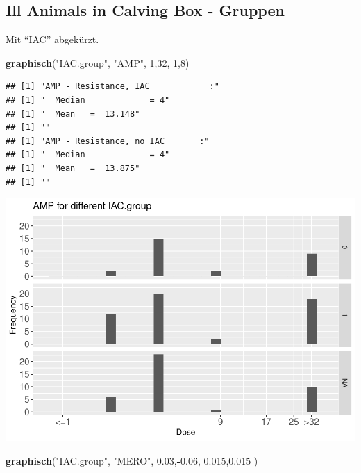 \documentclass[
]{article}
\newenvironment{Shaded}{\begin{snugshade}}{\end{snugshade}}
\newcommand{\DecValTok}[1]{\textcolor[rgb]{0.00,0.00,0.81}{#1}}
\newcommand{\FloatTok}[1]{\textcolor[rgb]{0.00,0.00,0.81}{#1}}
\newcommand{\KeywordTok}[1]{\textcolor[rgb]{0.13,0.29,0.53}{\textbf{#1}}}
\newcommand{\NormalTok}[1]{#1}
\newcommand{\OperatorTok}[1]{\textcolor[rgb]{0.81,0.36,0.00}{\textbf{#1}}}
\newcommand{\StringTok}[1]{\textcolor[rgb]{0.31,0.60,0.02}{#1}}
\begin{document}
\hypertarget{ill-animals-in-calving-box---gruppen}{%
\subsection{Ill Animals in Calving Box -
Gruppen}\label{ill-animals-in-calving-box---gruppen}}

Mit ``IAC'' abgekürzt.

\begin{Shaded}
\begin{Highlighting}[]
  \KeywordTok{graphisch}\NormalTok{(}\StringTok{"IAC.group"}\NormalTok{, }\StringTok{"AMP"}\NormalTok{, }\DecValTok{1}\NormalTok{,}\DecValTok{32}\NormalTok{, }\DecValTok{1}\NormalTok{,}\DecValTok{8}\NormalTok{)  }
\end{Highlighting}
\end{Shaded}

\begin{verbatim}
## [1] "AMP - Resistance, IAC            :"
## [1] "  Median             = 4"
## [1] "  Mean   =  13.148"
## [1] ""
## [1] "AMP - Resistance, no IAC       :"
## [1] "  Median             = 4"
## [1] "  Mean   =  13.875"
## [1] ""
\end{verbatim}

\includegraphics{Verteilungen_files/figure-latex/unnamed-chunk-5-1.pdf}

\begin{Shaded}
\begin{Highlighting}[]
  \KeywordTok{graphisch}\NormalTok{(}\StringTok{"IAC.group"}\NormalTok{, }\StringTok{"MERO"}\NormalTok{, }\FloatTok{0.03}\NormalTok{,}\OperatorTok{-}\FloatTok{0.06}\NormalTok{,   }\FloatTok{0.015}\NormalTok{,}\FloatTok{0.015}\NormalTok{ )}
\end{Highlighting}
\end{Shaded}
\end{document}
